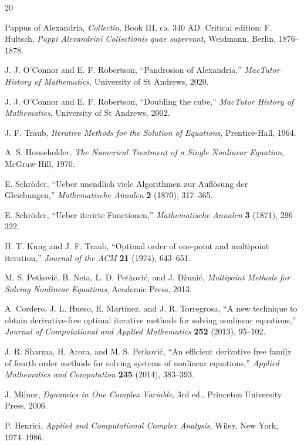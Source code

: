 \documentclass[10pt,a4paper]{article}
\theoremstyle{plain}
\theoremstyle{definition}
\theoremstyle{remark}
\begin{document}
\begin{thebibliography}{20}

Pappus of Alexandria,
\textit{Collectio}, Book III, ca. 340 AD.
Critical edition: F. Hultsch, \textit{Pappi Alexandrini Collectionis quae supersunt},
Weidmann, Berlin, 1876--1878.

J. J. O'Connor and E. F. Robertson,
``Pandrosion of Alexandria,''
\textit{MacTutor History of Mathematics}, University of St Andrews, 2020.

J. J. O'Connor and E. F. Robertson,
``Doubling the cube,''
\textit{MacTutor History of Mathematics}, University of St Andrews, 2002.

J. F. Traub,
\textit{Iterative Methods for the Solution of Equations},
Prentice-Hall, 1964.

A. S. Householder,
\textit{The Numerical Treatment of a Single Nonlinear Equation},
McGraw-Hill, 1970.

E. Schr\"oder,
``Ueber unendlich viele Algorithmen zur Aufl\"osung der Gleichungen,''
\textit{Mathematische Annalen} \textbf{2} (1870), 317--365.

E. Schr\"oder,
``Ueber iterirte Functionen,''
\textit{Mathematische Annalen} \textbf{3} (1871), 296--322.

H. T. Kung and J. F. Traub,
``Optimal order of one-point and multipoint iteration,''
\textit{Journal of the ACM} \textbf{21} (1974), 643--651.

M. S. Petkovi\'c, B. Neta, L. D. Petkovi\'c, and J. D\v{z}uni\'c,
\textit{Multipoint Methods for Solving Nonlinear Equations},
Academic Press, 2013.

A. Cordero, J. L. Hueso, E. Mart\'inez, and J. R. Torregrosa,
``A new technique to obtain derivative-free optimal iterative methods for solving nonlinear equations,''
\textit{Journal of Computational and Applied Mathematics} \textbf{252} (2013), 95--102.

J. R. Sharma, H. Arora, and M. S. Petkovi\'c,
``An efficient derivative free family of fourth order methods for solving systems of nonlinear equations,''
\textit{Applied Mathematics and Computation} \textbf{235} (2014), 383--393.

J. Milnor,
\textit{Dynamics in One Complex Variable},
3rd ed., Princeton University Press, 2006.

P. Henrici,
\textit{Applied and Computational Complex Analysis},
Wiley, New York, 1974--1986.

\end{thebibliography}
\end{document}
